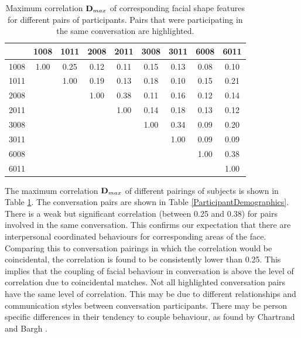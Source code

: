 \begin{table}[tb]
\centering
\caption{Maximum correlation $\textbf{D}_{max}$ of corresponding facial shape features for different pairs of participants. Pairs that were participating in the same conversation are highlighted.}
\begin{tabular}{ | c | c | c | c | c | c | c | c | c |}
\hline
& 1008 & 1011 & 2008 & 2011 & 3008 & 3011 & 6008 & 6011 \\
\hline
1008 & \cellcolor{orange} 1.00 & \cellcolor{orange} 0.25 & 0.12 & 0.11 & 0.15 & 0.13 & 0.08 & 0.10\\
1011 & \cellcolor{orange} & \cellcolor{orange} 1.00& 0.19& 0.13& 0.18& 0.10& 0.15& 0.21\\
2008 & & & \cellcolor{orange} 1.00& \cellcolor{orange} 0.38& 0.11& 0.16& 0.12& 0.14\\
2011 & & & \cellcolor{orange} & \cellcolor{orange} 1.00 & 0.14& 0.18& 0.13& 0.12\\
3008 & & & & & \cellcolor{orange} 1.00 & \cellcolor{orange} 0.34& 0.09&0.20\\
3011 & & & & & \cellcolor{orange} & \cellcolor{orange} 1.00& 0.09& 0.09\\
6008 & & & & & & & \cellcolor{orange} 1.00& \cellcolor{orange} 0.38\\
6011 & & & & & & & \cellcolor{orange} & \cellcolor{orange} 1.00\\
\hline
\end{tabular}
\label{TableBackchannelShapePairs}
\end{table}

The maximum correlation $\textbf{D}_{max}$ of different pairings of subjects is shown in Table \ref{TableBackchannelShapePairs}. The conversation pairs are shown in Table \ref{ParticipantDemographics}. There is a weak but significant correlation (between 0.25 and 0.38) for pairs involved in the same conversation. This confirms our expectation that there are interpersonal coordinated behaviours for corresponding areas of the face. Comparing this to conversation pairings in which the correlation would be coincidental, the correlation is found to be consistently lower than 0.25. This implies that the coupling of facial behaviour in conversation is above the level of correlation due to coincidental matches. Not all highlighted conversation pairs have the same level of correlation. This may be due to different relationships and communication styles between conversation participants. There may be person specific differences in their tendency to couple behaviour, as found by Chartrand and Bargh \cite{Chartrand1999}.


